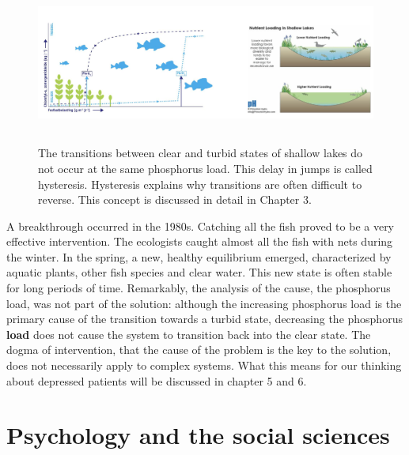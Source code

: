 \documentclass[
  letterpaper,
]{scrbook}
\begin{document}
\begin{figure}

{\centering \includegraphics[width=6.26389in,height=2.10139in]{media/ch1/image2.jpg}

}

\caption{\label{fig-ch1-img2}The transitions between clear and turbid
states of shallow lakes do not occur at the same phosphorus load. This
delay in jumps is called hysteresis. Hysteresis explains why transitions
are often difficult to reverse. This concept is discussed in detail in
Chapter 3.}

\end{figure}

A breakthrough occurred in the 1980s. Catching all the fish proved to be
a very effective intervention. The ecologists caught almost all the fish
with nets during the winter. In the spring, a new, healthy equilibrium
emerged, characterized by aquatic plants, other fish species and clear
water. This new state is often stable for long periods of time.
Remarkably, the analysis of the cause, the phosphorus load, was not part
of the solution: although the increasing phosphorus load is the primary
cause of the transition towards a turbid state, decreasing the
phosphorus \textbf{load} does not cause the system to transition back
into the clear state. The dogma of intervention, that the cause of the
problem is the key to the solution, does not necessarily apply to
complex systems. What this means for our thinking about depressed
patients will be discussed in chapter 5 and 6.

\hypertarget{psychology-and-the-social-sciences}{%
\section{Psychology and the social
sciences}\label{psychology-and-the-social-sciences}}
\end{document}
